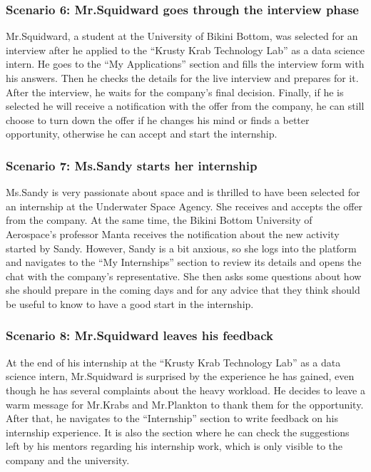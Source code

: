 \subsubsection{Scenario 6: Mr.Squidward goes through the interview phase}\label{subsubsec:scenario_6}
Mr.Squidward, a student at the University of Bikini Bottom, was selected for an interview after he applied to the ``Krusty Krab Technology 
Lab'' as a data science intern. He goes to the ``My Applications'' section and fills the interview form with his answers. Then he checks the details for the 
live interview and prepares for it. After the interview, he waits for the company's final decision. Finally, if he is selected he will receive a notification 
with the offer from the company, he can still choose to turn down the offer if he changes his mind or finds a better opportunity, otherwise he can accept and
start the internship.

\subsubsection{Scenario 7: Ms.Sandy starts her internship}\label{subsubsec:scenario_7}
Ms.Sandy is very passionate about space and is thrilled to have been selected for an internship at the Underwater Space Agency. She receives 
and accepts the offer from the company. At the same time, the Bikini Bottom University of Aerospace's professor Manta receives the notification
about the new activity started by Sandy. However, Sandy is a bit anxious, so she logs into the platform and navigates to the ``My Internships'' 
section to review its details and opens the chat with the company's representative. She then asks some questions about how she should prepare in the 
coming days and for any advice that they think should be useful to know to have a good start in the internship.

\subsubsection{Scenario 8: Mr.Squidward leaves his feedback}\label{subsubsec:scenario_8}
At the end of his internship at the ``Krusty Krab Technology Lab'' as a data science intern, Mr.Squidward is surprised by the experience 
he has gained, even though he has several complaints about the heavy workload. He decides to leave a warm message for Mr.Krabs and Mr.Plankton 
to thank them for the opportunity. After that, he navigates to the ``Internship'' section to write feedback on his internship experience. 
It is also the section where he can check the suggestions left by his mentors regarding his internship work, which is only visible to the 
company and the university.

